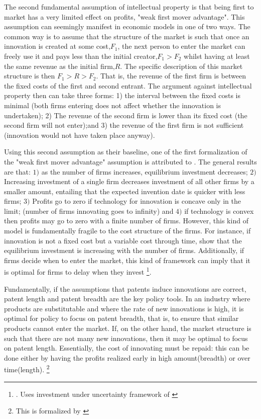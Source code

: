 

The second fundamental assumption of intellectual property is that being first to market has a very limited effect on profits, "weak first mover advantage". This assumption can seemingly manifest in economic models in one of two ways. The common way is to assume that the structure of the market is such that once an innovation is created at some cost,$F_1$, the next person to enter the market can freely use it and pays less than the initial creator,$F_1>F_2$ whilst having at least the same revenue as the initial firm,$R$. The specific description of this market structure is then $F_1>R>F_2$. That is, the revenue of the first firm is between the fixed costs of the first and second entrant. The argument against intellectual property then can take three forms: 1) the interval between the fixed costs is minimal (both firms entering does not affect whether the innovation is undertaken); 2) The revenue of the second firm is lower than its fixed cost (the second firm will not enter);and 3) the revenue of the first firm is not sufficient (innovation would not have taken place anyway).

Using this second assumption as their baseline, one of the first formalization of the "weak first mover advantage" assumption is attributed to \cite{loury_1979}. The general results are that: $1)$ as the number of firms increases, equilibrium investment decreases; $2)$ Increasing investment of a single firm decreases investment of all other firms by a smaller amount, entailing that the expected invention date is quicker with less firms; $3)$ Profits go to zero if technology for innovation is concave only in the limit; (number of firms innovating goes to infinity) and $4)$ if technology is convex then profits may go to zero with a finite number of firms. However, this kind of model is fundamentally fragile to the cost structure of the firms. For instance, if innovation is not a fixed cost but a variable cost through time, \cite{lee1980market} show that the equilibrium investment is increasing with the number of firms. Additionally, if firms decide when to enter the market, this kind of framework can imply that it is optimal for firms to delay when they invest \footnote{\cite{Weeds2002}. Uses investment under uncertainty framework of \cite{DixitPindyck1994}}.

Fundamentally, if the assumptions that patents induce innovations are correct, patent length and patent breadth are the key policy tools. In an industry where products are substitutable and where the rate of new innovations is high, it is optimal for policy to focus on patent breadth, that is, to ensure that similar products cannot enter the market. If, on the other hand, the market structure is such that there are not many new innovations, then it may be optimal to focus on patent length. Essentially, the cost of innovating must be repaid: this can be done either by having the profits realized early in high amount(breadth) or over time(length). \footnote{This is formalized by \cite{takalo2001optimal}}

